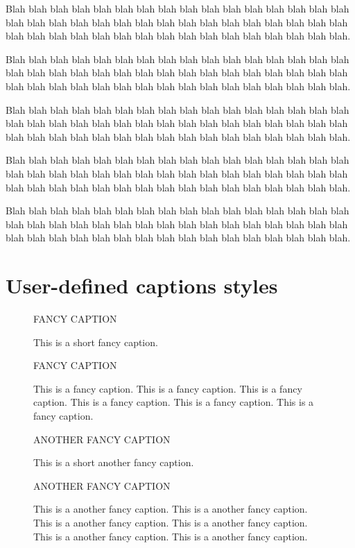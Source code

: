 \documentclass[a4paper]{article}
\newcommand*\centerlast{%
  \addtolength{\leftskip}{0pt plus 1fil}%
  \addtolength{\rightskip}{0pt plus -1fil}%
  \setlength{\parfillskip}{0pt plus 2fil}}
\newcommand*\mycaptionstyle{%
  \captionstyle{indent}%
  \renewcommand\captionfont{\small}%
  \renewcommand\captionlabelfont{\bfseries}%
  \setcaptionmargin{\leftmargini}%
  \setlength\captionindent{\parindent}%
  \renewcommand\captionlabeldelim{.}%
  \onelinecaptionstrue}
\newcommand*\shortcaption[1]{This is a short #1 caption.}
\newcommand*\longcaption[1]{This is a #1 caption. This is a #1 caption. This is a #1 caption.
  This is a #1 caption. This is a #1 caption. This is a #1 caption.}
\newcommand*\test[3]{%
  \begin{figure}[!ht]
  \centerline{\uppercase{#1 caption}}
  \caption[This figure sucks]{\label{#2}#3{#1}}
  \end{figure}}
\begin{document}
Blah blah blah blah blah blah blah blah blah blah blah blah blah blah blah blah
blah blah blah blah blah blah blah blah blah blah blah blah blah blah blah blah
blah blah blah blah blah blah blah blah blah blah blah blah blah blah blah blah.

Blah blah blah blah blah blah blah blah blah blah blah blah blah blah blah blah
blah blah blah blah blah blah blah blah blah blah blah blah blah blah blah blah
blah blah blah blah blah blah blah blah blah blah blah blah blah blah blah blah.

Blah blah blah blah blah blah blah blah blah blah blah blah blah blah blah blah
blah blah blah blah blah blah blah blah blah blah blah blah blah blah blah blah
blah blah blah blah blah blah blah blah blah blah blah blah blah blah blah blah.

Blah blah blah blah blah blah blah blah blah blah blah blah blah blah blah blah
blah blah blah blah blah blah blah blah blah blah blah blah blah blah blah blah
blah blah blah blah blah blah blah blah blah blah blah blah blah blah blah blah.

Blah blah blah blah blah blah blah blah blah blah blah blah blah blah blah blah
blah blah blah blah blah blah blah blah blah blah blah blah blah blah blah blah
blah blah blah blah blah blah blah blah blah blah blah blah blah blah blah blah.
\fussy
\onecolumn


\clearpage
\mycaptionstyle
\section{User-defined captions styles}

\test{fancy}{fancy1}{\shortcaption}
\test{fancy}{fancy2}{\longcaption}

\renewcaptionstyle{fancy}{%
  \usecaptionmargin\captionfont%
  \onelinecaption{{\captionlabelfont\captionlabel:} \captiontext}%
    {{\centering\captionlabelfont\captionlabel\par}\centerlast\captiontext\par}}
\test{another fancy}{fancy3}{\shortcaption}
\test{another fancy}{fancy4}{\longcaption}

\end{document}
